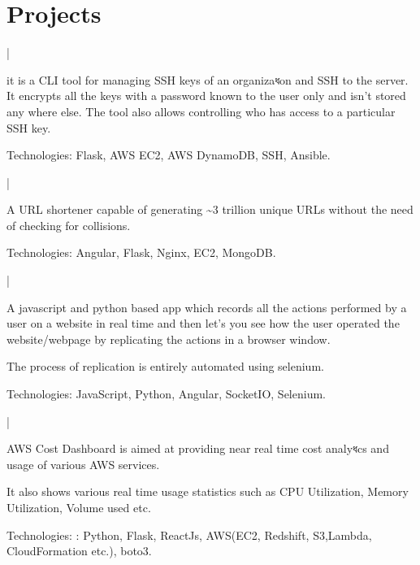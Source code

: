 \documentclass[letterpaper]{deedy-resume}
\begin{document}
\begin{minipage}[t]{0.66\textwidth}
\section{Projects}

 |
\begin{tightitemize}
\item it is a CLI tool for managing SSH keys of an organizaধon and SSH to
the server. It encrypts all the keys with a password known to the user
only and isn’t stored any where else. The tool also allows controlling
who has access to a particular SSH key. \\
\item Technologies: Flask, AWS EC2, AWS DynamoDB, SSH, Ansible.\\
\end{tightitemize}
\sectionspace 

 |
\begin{tightitemize}
\item A URL shortener capable of generating \textasciitilde3 trillion unique URLs without the need of checking for collisions. \\
\item  Technologies: Angular, Flask, Nginx, EC2, MongoDB. \\
\end{tightitemize}
\sectionspace 

 |
\begin{tightitemize}
\item A javascript and python based app which records all the actions performed by a user on a website in real time and then let's you see how the user operated the website/webpage by replicating the actions in a browser window. \\
\item  The process of replication is entirely automated using selenium. \\
\item Technologies: JavaScript, Python, Angular, SocketIO, Selenium.
\end{tightitemize}
\sectionspace 

 |
\begin{tightitemize}
\item AWS Cost Dashboard is aimed at providing near real time cost analyধcs and usage of various AWS services. \\
\item  It also shows various real time usage statistics such as CPU Utilization, Memory Utilization, Volume used etc. \\
\item Technologies: : Python, Flask, ReactJs, AWS(EC2, Redshift, S3,Lambda, CloudFormation etc.), boto3.
\end{tightitemize}

\end{minipage}
\end{document}
